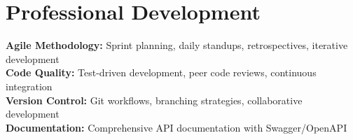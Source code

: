 \documentclass[11pt,letterpaper]{article}
\begin{document}
\section{Professional Development}
\textbf{Agile Methodology:} Sprint planning, daily standups, retrospectives, iterative development \\
\textbf{Code Quality:} Test-driven development, peer code reviews, continuous integration \\
\textbf{Version Control:} Git workflows, branching strategies, collaborative development \\
\textbf{Documentation:} Comprehensive API documentation with Swagger/OpenAPI
\end{document}
